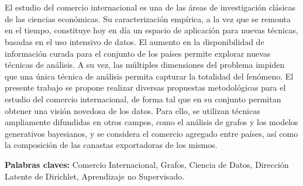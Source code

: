 \chapter*{\runtitulo}

\noindent

El estudio del comercio internacional es una de las áreas de investigación clásicas de las ciencias económicas. Su caracterización empírica, a la vez que se remonta en el tiempo, constituye hoy en día un espacio de aplicación para nuevas técnicas, basadas en el uso intensivo de datos. El aumento en la disponibilidad de información curada para el conjunto de los países permite explorar nuevas técnicas de análisis. A su vez, las múltiples dimensiones del problema impiden que una única técnica de análisis permita capturar la totalidad del fenómeno. El presente trabajo se propone realizar diversas propuestas metodológicas para el estudio del comercio internacional, de forma tal que en su conjunto permitan obtener una visión novedosa de los datos. Para ello, se utilizan técnicas ampliamente difundidas en otros campos, como el análisis de grafos y los modelos generativos bayesianos, y se considera el comercio agregado entre países, así como la composición de las canastas exportadoras de los mismos. 

\bigskip

\noindent\textbf{Palabras claves:} Comercio Internacional, Grafos, Ciencia de Datos, Dirección Latente de Dirichlet, Aprendizaje no Supervisado.